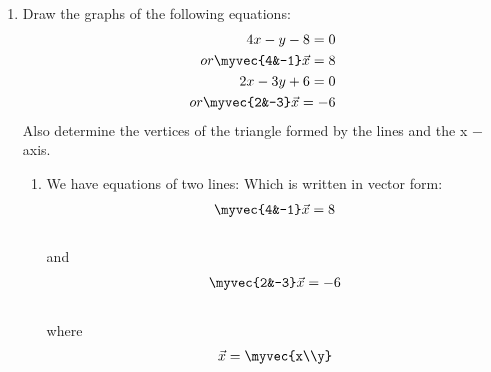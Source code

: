 \documentclass[journal,12pt,twocolumn]{IEEEtran}
\renewcommand\thesection{\arabic{section}}
\begin{document}
\begin{enumerate}[label=\thesection.\arabic*.,ref=\thesection.\theenumi]
\item Draw the graphs of the following equations: 
\begin{align}
     4x-y-8=0 \\or \myvec{4&-1}\vec{x}=8\\
2x-3y+6=0 \\or \myvec{2&-3}\vec{x}=-6
\end{align} 
Also determine the vertices of the
triangle formed by the lines and the x − axis.
\\
\solution\begin{enumerate}
    \item We have equations of two lines:
    Which is written in vector form:
    \begin{align}\label{eq:1}
        \myvec{4&-1}\vec{x}=8
    \end{align}\\
    and 
    \begin{align}\label{eq:2}
        \myvec{2&-3}\vec{x}=-6
    \end{align}
\\where \begin{align}
        \vec{x}=\myvec{x\\y}
    \end{align}


\end{enumerate}
\end{enumerate}
\end{document}
